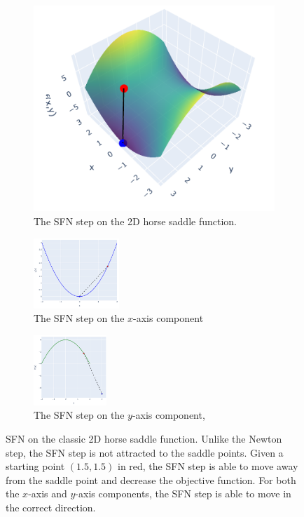 \begin{figure}[h]
    \begin{subfigure}[b]{0.33\linewidth}
        \centering
        \includegraphics[width=\linewidth]{figures/4method/sfn_2d.png}
        \caption{The SFN step on the 2D horse saddle function.}
        \label{fig:sfn_2d}
    \end{subfigure}
    \hfill
    \begin{subfigure}[b]{0.32\linewidth}
        \centering
        \includegraphics[width=\linewidth, height=100px]{figures/4method/sfn_x.png}
        \caption{The SFN step on the $x$-axis component}
        \label{fig:sfn_x}
    \end{subfigure}
    \hfill
    \begin{subfigure}[b]{0.33\linewidth}
        \centering
        \includegraphics[width=\linewidth, height=100px]{figures/4method/sfn_y.png}
        \caption{The SFN step on the $y$-axis component,}
        \label{fig:sfn_y}
    \end{subfigure}
    \caption{SFN on the classic 2D horse saddle function. Unlike the Newton step, the SFN step is not attracted to the saddle points. 
    Given a starting point $(1.5, 1.5)$ in red, the SFN step is able to move away from the saddle point and decrease the objective function. For both the $x$-axis and $y$-axis components, the SFN step is able to move in the correct direction.}
    \label{fig:sfn_example}
\end{figure}

